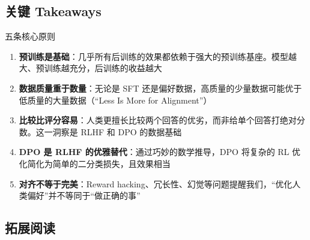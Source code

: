 \subsection{关键 Takeaways}

\begin{importantbox}{五条核心原则}
\begin{enumerate}
    \item \textbf{预训练是基础}：几乎所有后训练的效果都依赖于强大的预训练基座。模型越大、预训练越充分，后训练的收益越大
    \item \textbf{数据质量重于数量}：无论是 SFT 还是偏好数据，高质量的少量数据可能优于低质量的大量数据（``Less Is More for Alignment''）
    \item \textbf{比较比评分容易}：人类更擅长比较两个回答的优劣，而非给单个回答打绝对分数。这一洞察是 RLHF 和 DPO 的数据基础
    \item \textbf{DPO 是 RLHF 的优雅替代}：通过巧妙的数学推导，DPO 将复杂的 RL 优化简化为简单的二分类损失，且效果相当
    \item \textbf{对齐不等于完美}：Reward hacking、冗长性、幻觉等问题提醒我们，``优化人类偏好''并不等同于``做正确的事''
\end{enumerate}
\end{importantbox}

\subsection{拓展阅读}

